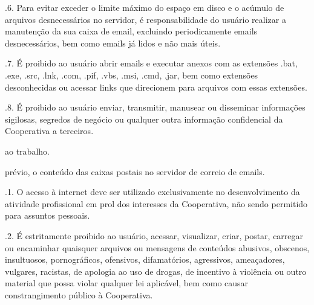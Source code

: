 \documentclass[a4paper,10pt,portuges]{sphinxmanual}
\begin{document}
.6. Para evitar exceder o limite máximo do espaço em disco e o acúmulo de arquivos desnecessários no servidor, é
responsabilidade do usuário realizar a manutenção da sua caixa de e\sphinxhyphen{}mail, excluindo periodicamente e\sphinxhyphen{}mails
desnecessários, bem como e\sphinxhyphen{}mails já lidos e não mais úteis.

.7. É proibido ao usuário abrir e\sphinxhyphen{}mails e executar anexos com as extensões .bat, .exe, .src, .lnk, .com,
.pif, .vbs, .msi, .cmd, .jar, bem como extensões desconhecidas ou acessar links que direcionem para arquivos
com essas extensões.

.8. É proibido ao usuário enviar, transmitir, manusear ou disseminar informações sigilosas, segredos de negócio
ou qualquer outra informação confidencial da Cooperativa a terceiros.
\begin{description}
\begin{description}
\sphinxAtStartPar
ao trabalho.

\end{description}

\sphinxAtStartPar
prévio, o conteúdo das caixas postais no servidor de correio de e\sphinxhyphen{}mails.

\end{description}

.1. O acesso à internet deve ser utilizado exclusivamente no desenvolvimento da atividade profissional em prol dos interesses da Cooperativa, não sendo permitido para assuntos pessoais.

.2. É estritamente proibido ao usuário, acessar, visualizar, criar, postar, carregar ou encaminhar quaisquer arquivos ou mensagens de conteúdos abusivos, obscenos, insultuosos, pornográficos, ofensivos, difamatórios, agressivos, ameaçadores, vulgares, racistas, de apologia ao uso de drogas, de incentivo à violência ou outro material que possa violar qualquer lei aplicável, bem como causar constrangimento público à Cooperativa.
\end{document}

